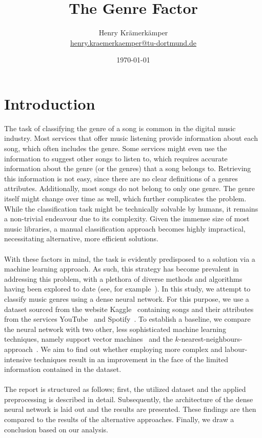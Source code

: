 \documentclass[
  12pt,
  bibliography=totoc,     %
  captions=tableheading,  %
  titlepage=firstiscover, %
]{scrartcl}
\author{%
  Henry Krämerkämper\\%
  \href{mailto:henry.kraemerkaemper@tu-dortmund.de}{henry.kraemerkaemper@tu-dortmund.de}%
}
\title{The Genre Factor}
\date{\today}
\begin{document}
\maketitle
\thispagestyle{empty}
\tableofcontents
\newpage
{}

\section{Introduction}
The task of classifying the genre of a song is common in the digital music industry. Most services
that offer music listening provide information about each song, which often includes the genre.
Some services might even use the information to suggest other songs to listen to, which requires
accurate information about the genre (or the genres) that a song belongs to. Retrieving this
information is not easy, since there are no clear definitions of a genres attributes. Additionally,
most songs do not belong to only one genre. The genre itself might change over time as well, which
further complicates the problem. While the classification task might be technically solvable by humans,
it remains a non-trivial endeavour due to its complexity. Given the immense size of most
music libraries, a manual classification approach becomes highly impractical, necessitating alternative,
more efficient solutions. \\
\\
\noindent
With these factors in mind, the task is evidently predisposed to a solution via a machine learning approach.
As such, this strategy has become prevalent in addressing this problem, with a plethora of diverse methods and algorithms having been explored to date
(see, for example~\cite{Übersicht2011}).
In this study, we attempt to classify music genres using a dense neural network. For this purpose, we use a dataset sourced
from the website Kaggle~\cite{Kaggle} containing songs and their attributes from the services YouTube~\cite{Youtube}
and Spotify~\cite{Spotify}. To establish a baseline, we compare the neural network with two other, less sophisticated machine learning techniques,
namely support vector machines~\cite{SupportVector} and the $k$-nearest-neighbours-approach~\cite{NearestNeighbours}.
We aim to find out whether employing more complex and labour-intensive techniques result in an
improvement in the face of the limited information contained in the dataset. \\
\\
\noindent
The report is structured as follows; first, the utilized dataset and the applied preprocessing is described in detail.
Subsequently, the architecture of the dense neural network is laid out and the results are presented. These findings are then
compared to the results of the alternative approaches. Finally, we draw a conclusion based on our analysis.
\end{document}
